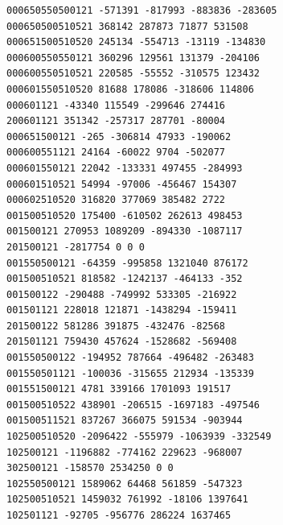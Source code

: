 \begin{Verbatim}[fontsize=\footnotesize]
000650550500121 -571391 -817993 -883836 -283605
000650500510521 368142 287873 71877 531508
000651500510520 245134 -554713 -13119 -134830
000600550550121 360296 129561 131379 -204106
000600550510521 220585 -55552 -310575 123432
000601550510520 81688 178086 -318606 114806
000601121 -43340 115549 -299646 274416
200601121 351342 -257317 287701 -80004
000651500121 -265 -306814 47933 -190062
000600551121 24164 -60022 9704 -502077
000601550121 22042 -133331 497455 -284993
000601510521 54994 -97006 -456467 154307
000602510520 316820 377069 385482 2722
001500510520 175400 -610502 262613 498453
001500121 270953 1089209 -894330 -1087117
201500121 -2817754 0 0 0
001550500121 -64359 -995858 1321040 876172
001500510521 818582 -1242137 -464133 -352
001500122 -290488 -749992 533305 -216922
001501121 228018 121871 -1438294 -159411
201500122 581286 391875 -432476 -82568
201501121 759430 457624 -1528682 -569408
001550500122 -194952 787664 -496482 -263483
001550501121 -100036 -315655 212934 -135339
001551500121 4781 339166 1701093 191517
001500510522 438901 -206515 -1697183 -497546
001500511521 837267 366075 591534 -903944
102500510520 -2096422 -555979 -1063939 -332549
102500121 -1196882 -774162 229623 -968007
302500121 -158570 2534250 0 0
102550500121 1589062 64468 561859 -547323
102500510521 1459032 761992 -18106 1397641
102501121 -92705 -956776 286224 1637465
\end{Verbatim}
